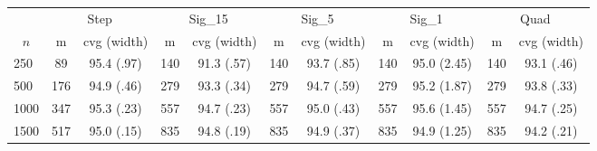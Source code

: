 \documentclass{article}
\begin{document}
\begin{tabular}{lcccccccccc}
   \hline
 
           & \multicolumn{2}{c}{Step}& \multicolumn{2}{c}{Sig\_15}& \multicolumn{2}{c}{Sig\_5}& \multicolumn{2}{c}{Sig\_1}& \multicolumn{2}{c}{Quad} \\ 
             \cmidrule(l{2pt}r{2pt}){2-3} \cmidrule(l{2pt}r{2pt}){4-5} \cmidrule(l{2pt}r{2pt}){6-7} \cmidrule(l{2pt}r{2pt}){8-9}  \cmidrule(l{2pt}r{2pt}){10-11} 
             \multicolumn{1}{c}{$n$} & \multicolumn{1}{c}{m}& \multicolumn{1}{c}{cvg (width)}& \multicolumn{1}{c}{m}& \multicolumn{1}{c}{cvg (width)}& \multicolumn{1}{c}{m}& \multicolumn{1}{c}{cvg (width)}& \multicolumn{1}{c}{m}& \multicolumn{1}{c}{cvg (width)}& \multicolumn{1}{c}{m}& \multicolumn{1}{c}{cvg (width)} \\ \hline
        250 & 89 & 95.4 (.97) & 140 & 91.3 (.57) & 140 & 93.7 (.85) & 140 & 95.0 (2.45) & 140 & 93.1 (.46) \\ 
  500 & 176 & 94.9 (.46) & 279 & 93.3 (.34) & 279 & 94.7 (.59) & 279 & 95.2 (1.87) & 279 & 93.8 (.33) \\ 
  1000 & 347 & 95.3 (.23) & 557 & 94.7 (.23) & 557 & 95.0 (.43) & 557 & 95.6 (1.45) & 557 & 94.7 (.25) \\ 
  1500 & 517 & 95.0 (.15) & 835 & 94.8 (.19) & 835 & 94.9 (.37) & 835 & 94.9 (1.25) & 835 & 94.2 (.21) \\ 
   \hline
\end{tabular}
\end{document}
